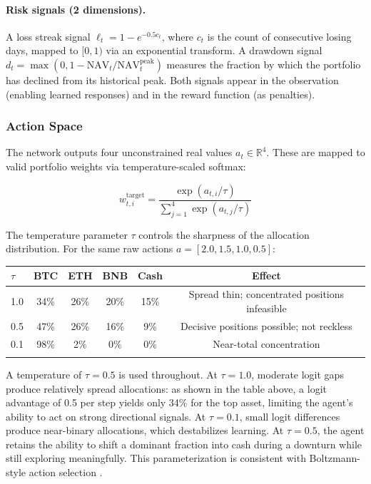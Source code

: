 \documentclass[pdflatex,sn-mathphys-num]{sn-jnl}
\begin{document}
\paragraph{Risk signals (2 dimensions).}
A loss streak signal $\ell_t = 1 - e^{-0.5 c_t}$, where $c_t$ is the count
of consecutive losing days, mapped to $[0, 1)$ via an exponential transform.
A drawdown signal $d_t = \max(0, 1 - \mathrm{NAV}_t / \mathrm{NAV}_t^{\mathrm{peak}})$
measures the fraction by which the portfolio has declined from its historical
peak. Both signals appear in the observation (enabling learned responses) and
in the reward function (as penalties).

\subsubsection{Action Space}\label{sec:action}

The network outputs four unconstrained real values $a_t \in \mathbb{R}^{4}$.
These are mapped to valid portfolio weights via temperature-scaled softmax:

\begin{equation}\label{eq:softmax}
    w_{t,i}^{\mathrm{target}} = \frac{\exp(a_{t,i} / \tau)}{\sum_{j=1}^{4}
    \exp(a_{t,j} / \tau)}
\end{equation}

The temperature parameter $\tau$ controls the sharpness of the allocation
distribution. For the same raw actions $a = [2.0, 1.5, 1.0, 0.5]$:

\begin{center}
\begin{tabular}{lccccc}
\toprule
$\tau$ & BTC & ETH & BNB & Cash & Effect \\
\midrule
1.0  & 34\% & 26\% & 20\% & 15\% & Spread thin; concentrated positions infeasible \\
0.5  & 47\% & 26\% & 16\% & 9\%  & Decisive positions possible; not reckless \\
0.1  & 98\% & 2\%  & 0\%  & 0\%  & Near-total concentration \\
\botrule
\end{tabular}
\end{center}

A temperature of $\tau = 0.5$ is used throughout. At $\tau = 1.0$, moderate
logit gaps produce relatively spread allocations: as shown in the table above,
a logit advantage of 0.5 per step yields only 34\% for the top asset, limiting
the agent's ability to act on strong directional signals. At $\tau = 0.1$,
small logit differences produce near-binary allocations, which destabilizes
learning. At $\tau = 0.5$, the agent retains the ability to shift a dominant
fraction into cash during a downturn while still exploring meaningfully.
This parameterization is consistent with Boltzmann-style action selection
\cite{sutton2018reinforcement}.
\end{document}
